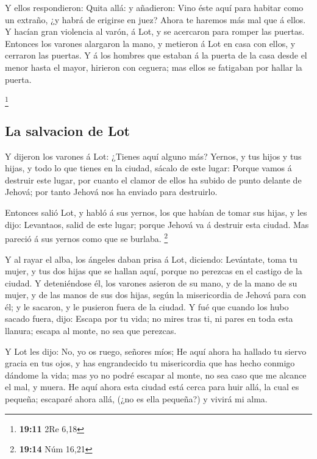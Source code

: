  Y ellos respondieron: Quita allá: y añadieron: Vino éste
aquí para habitar como un extraño, ¿y habrá de erigirse en juez? Ahora
te haremos más mal que á ellos. Y hacían gran violencia al varón, á Lot,
y se acercaron para romper las puertas.  Entonces los
varones alargaron la mano, y metieron á Lot en casa con ellos, y
cerraron las puertas.  Y á los hombres que estaban á la
puerta de la casa desde el menor hasta el mayor, hirieron con ceguera;
mas ellos se fatigaban por hallar la puerta.

\footnote{\textbf{19:11} 2Re 6,18}

\hypertarget{la-salvacion-de-lot}{%
\subsection{La salvacion de Lot}\label{la-salvacion-de-lot}}

 Y dijeron los varones á Lot: ¿Tienes aquí alguno más?
Yernos, y tus hijos y tus hijas, y todo lo que tienes en la ciudad,
sácalo de este lugar:  Porque vamos á destruir este
lugar, por cuanto el clamor de ellos ha subido de punto delante de
Jehová; por tanto Jehová nos ha enviado para destruirlo.

 Entonces salió Lot, y habló á sus yernos, los que habían
de tomar sus hijas, y les dijo: Levantaos, salid de este lugar; porque
Jehová va á destruir esta ciudad. Mas pareció á sus yernos como que se
burlaba. \footnote{\textbf{19:14} Núm 16,21}

 Y al rayar el alba, los ángeles daban prisa á Lot,
diciendo: Levántate, toma tu mujer, y tus dos hijas que se hallan aquí,
porque no perezcas en el castigo de la ciudad.  Y
deteniéndose él, los varones asieron de su mano, y de la mano de su
mujer, y de las manos de sus dos hijas, según la misericordia de Jehová
para con él; y le sacaron, y le pusieron fuera de la ciudad.
 Y fué que cuando los hubo sacado fuera, dijo: Escapa por
tu vida; no mires tras ti, ni pares en toda esta llanura; escapa al
monte, no sea que perezcas.

 Y Lot les dijo: No, yo os ruego, señores míos;
 He aquí ahora ha hallado tu siervo gracia en tus ojos, y
has engrandecido tu misericordia que has hecho conmigo dándome la vida;
mas yo no podré escapar al monte, no sea caso que me alcance el mal, y
muera.  He aquí ahora esta ciudad está cerca para huir
allá, la cual es pequeña; escaparé ahora allá, (¿no es ella pequeña?) y
vivirá mi alma.

